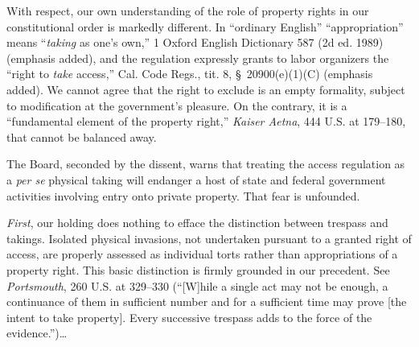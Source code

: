 With respect, our own understanding of the role of property rights in our
constitutional order is markedly different. In ``ordinary English''
``appropriation'' means ``\textit{taking} as one's own,'' 1 Oxford English
Dictionary 587 (2d ed. 1989) (emphasis added), and the regulation expressly
grants to labor organizers the ``right to \textit{take} access,'' Cal. Code
Regs., tit. 8, \S~20900(e)(1)(C) (emphasis added). We cannot agree that the
right to exclude is an empty formality, subject to modification at the
government's pleasure. On the contrary, it is a ``fundamental element of the
property right,'' \textit{Kaiser Aetna}, 444 U.S. at 179--180, that cannot be
balanced away.



The Board, seconded by the dissent, warns that treating the access regulation as
a \textit{per se} physical taking will endanger a host of state and federal
government activities involving entry onto private property. That fear is
unfounded.


\textit{First}, our holding does nothing to efface the distinction between
trespass and takings. Isolated physical invasions, not undertaken pursuant to a
granted right of access, are properly assessed as individual torts rather than
appropriations of a property right. This basic distinction is firmly grounded in
our precedent. See \textit{Portsmouth}, 260 U.S. at 329--330 (``[W]hile a single
act may not be enough, a continuance of them in sufficient number and for a
sufficient time may prove [the intent to take property]. Every successive
trespass adds to the force of the evidence.'')\ldots




